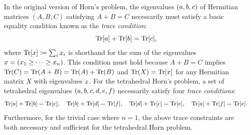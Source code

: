 \documentclass[notitlepage, 10pt]{article}
\begin{document}
\begin{rem}
    In the original version of Horn's problem, the eigenvalues $(a, b, c)$ of Hermitian matrices $(A,B,C)$ satisfying $A+B=C$ necessarily must satisfy a basic equality condition known as the \textit{trace condition}:
    \begin{equation}
        \label{eq:tri_trace_cond}
        {\operatorname{Tr}[a]}+{\operatorname{Tr}[b]}={\operatorname{Tr}[c]},
    \end{equation}
    where ${\operatorname{Tr}[x]} \coloneqq \sum_{i} x_i$ is shorthand for the sum of the eigenvalues $x = (x_1 \geq \cdots \geq x_n)$.
    This condition must hold because $A+B=C$ implies $\operatorname{Tr}(C) = \operatorname{Tr}(A+B) = \operatorname{Tr}(A)+\operatorname{Tr}(B)$ and $\operatorname{Tr}(X) = {\operatorname{Tr}[x]}$ for any Hermitian matrix $X$ with eigenvalues $x$.
    For the tetrahedral Horn's problem, a set of tetrahedral eigenvalues $(a,b,c,d,e,f)$ necessarily satisfy four \textit{trace conditions}:
    \begin{equation}
        \label{eq:tet_trace_conds}
        {\operatorname{Tr}[a]} + {\operatorname{Tr}[b]} = {\operatorname{Tr}[c]}, \quad
        {\operatorname{Tr}[b]} + {\operatorname{Tr}[d]} = {\operatorname{Tr}[f]}, \quad
        {\operatorname{Tr}[d]} + {\operatorname{Tr}[c]} = {\operatorname{Tr}[e]}, \quad
        {\operatorname{Tr}[a]} + {\operatorname{Tr}[f]} = {\operatorname{Tr}[e]}.
    \end{equation}
    Furthermore, for the trivial case where $n=1$, the above trace constraints are both necessary and sufficient for the tetrahedral Horn problem.
\end{rem}
\end{document}
